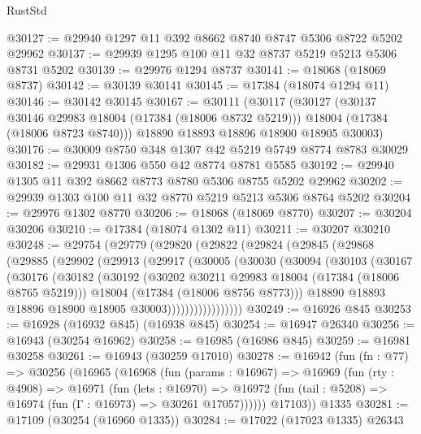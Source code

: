 \begin{lexlean}{RustStd}
\begin{coremodule}
@30127 := @29940 @1297 @11 @392 @8662 @8740 @8747 @5306 @8722 @5202 @29962
@30137 := @29939 @1295 @100 @11 @32 @8737 @5219 @5213 @5306 @8731 @5202
@30139 := @29976 @1294 @8737
@30141 := @18068 (@18069 @8737)
@30142 := @30139 @30141
@30145 := @17384 (@18074 @1294 @11)
@30146 := @30142 @30145
@30167 := @30111
    (@30117
      (@30127
        (@30137 @30146 @29983 @18004 (@17384 (@18006 @8732 @5219)))
        @18004
        (@17384 (@18006 @8723 @8740)))
      @18890
      @18893
      @18896
      @18900
      @18905
      @30003)
@30176 := @30009 @8750 @348 @1307 @42 @5219 @5749 @8774 @8783 @30029
@30182 := @29931 @1306 @550 @42 @8774 @8781 @5585
@30192 := @29940 @1305 @11 @392 @8662 @8773 @8780 @5306 @8755 @5202 @29962
@30202 := @29939 @1303 @100 @11 @32 @8770 @5219 @5213 @5306 @8764 @5202
@30204 := @29976 @1302 @8770
@30206 := @18068 (@18069 @8770)
@30207 := @30204 @30206
@30210 := @17384 (@18074 @1302 @11)
@30211 := @30207 @30210
@30248 := @29754
    (@29779
      (@29820
        (@29822
          (@29824
            (@29845
              (@29868
                (@29885
                  (@29902
                    (@29913
                      (@29917
                        (@30005
                          (@30030
                            (@30094
                              (@30103
                                (@30167
                                  (@30176
                                    (@30182
                                      (@30192
                                        (@30202 @30211 @29983 @18004 (@17384 (@18006 @8765 @5219)))
                                        @18004
                                        (@17384 (@18006 @8756 @8773)))
                                      @18890
                                      @18893
                                      @18896
                                      @18900
                                      @18905
                                      @30003)))))))))))))))))
@30249 := @16926 @845
@30253 := @16928 (@16932 @845) (@16938 @845)
@30254 := @16947 @26340
@30256 := @16943 (@30254 @16962)
@30258 := @16985 (@16986 @845)
@30259 := @16981 @30258
@30261 := @16943 (@30259 @17010)
@30278 := @16942
    (fun (fn : @77) =>
    @30256
      (@16965
        (@16968
          (fun (params : @16967) =>
          @16969
            (fun (rty : @4908) =>
            @16971
              (fun (lets : @16970) =>
              @16972 (fun (tail : @5208) => @16974 (fun (Γ : @16973) => @30261 @17057))))))
        @17103))
    @1335
@30281 := @17109 (@30254 (@16960 @1335))
@30284 := @17022 (@17023 @1335) @26343

\end{coremodule}
\end{lexlean}
